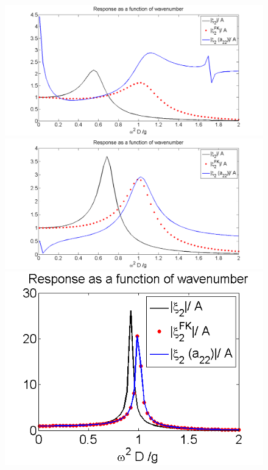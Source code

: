 \documentclass[a4paper,10pt]{article}
\begin{document}
\begin{figure}[H]
  \includegraphics[width=\linewidth]{respons1.png}
  \caption{}\label{X2_2_box1}
\endminipage
{}
  \includegraphics[width=\linewidth]{respons2.png}
  \caption{}\label{X2_2_box2}
\endminipage
{}%
  \includegraphics[width=\linewidth]{respons.png}
  \caption{}\label{res_box3}
\endminipage
\end{figure}
\end{document}
